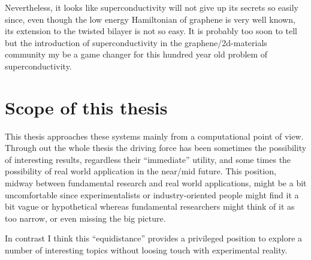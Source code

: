 Nevertheless, it looks like superconductivity will not give up its secrets so easily since, even though the low energy Hamiltonian of graphene is very well known, its extension to the twisted bilayer is not so easy.
It is probably too soon to tell but the introduction of superconductivity in the graphene/2d-materials community my be a game changer for this hundred year old problem of superconductivity.


\section{Scope of this thesis}
This thesis approaches these systems mainly from a computational point of view.
%
%
Through out the whole thesis the driving force has been sometimes the possibility of interesting results, regardless their ``immediate'' utility, and some times the possibility of real world application in the near/mid future.
This position, midway between fundamental research and real world applications, might be a bit uncomfortable since experimentalists or industry-oriented people might find it a bit vague or hypothetical whereas fundamental researchers might think of it as too narrow, or even missing the big picture.

In contrast I think this ``equidistance'' provides a privileged position to explore a number of interesting topics without loosing touch with experimental reality.
\bigskip


